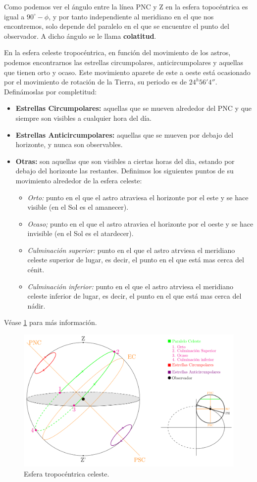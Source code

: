 Como podemos ver el ángulo entre la línea PNC y Z en la esfera topocéntrica es igual a $90^\circ - \phi$, y por tanto independiente al meridiano en el que nos encontremos, solo depende del paralelo en el que se encuentre el punto del observador. A dicho ángulo se le llama \textbf{colatitud}.

En la esfera celeste tropocéntrica, en función del movimiento de los astros, podemos encontrarnos las estrellas circumpolares, anticircumpolares y aquellas que tienen orto y ocaso. Este movimiento aparete de este a oeste está ocasionado por el movimiento de rotación de la Tierra, su periodo es de $24^h56'4''$. Definámoslas por completitud: 

\begin{itemize}
	\item \textbf{Estrellas Circumpolares:} aquellas que se mueven alrededor del PNC y que siempre son visibles a cualquier hora del día.
	\item \textbf{Estrellas Anticircumpolares:} aquellas que se mueven por debajo del horizonte, y nunca son observables. 
	\item \textbf{Otras:} son aquellas que son visibles a ciertas horas del dia, estando por debajo del horizonte las restantes. Definimos los siguientes puntos de su movimiento alrededor de la esfera celeste: 
	\begin{itemize}
		\item \textit{Orto:} punto en el que el astro atraviesa el horizonte por el este y se hace visible (en el Sol es el amanecer).
		\item \textit{Ocaso;} punto en el que el astro atraviea el horizonte por el oeste y se hace invisible (en el Sol es el atardecer).
		\item \textit{Culminación superior:} punto en el que el astro atrviesa el meridiano celeste superior de lugar, es decir, el punto en el que está mas cerca del cénit. 
		\item \textit{Culminación inferior:} punto en el que el astro atrviesa el meridiano celeste inferior de lugar, es decir, el punto en el que está mas cerca del nádir. 
	\end{itemize}
\end{itemize}
Véase \cref{Fig:01-orto} para más información.


\begin{figure}[h!] \centering
	\includegraphics[width=0.6\linewidth]{Cuerpo/Ch_01/Culminacion.png}
	\caption{Esfera tropocéntrica celeste.}
	\label{Fig:01-orto}
\end{figure}

